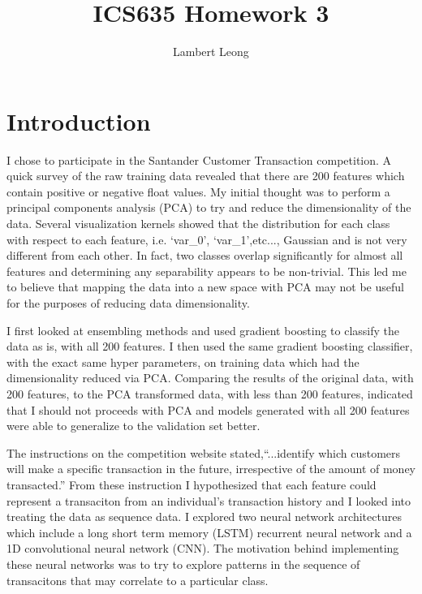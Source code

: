 \documentclass[11pt,letterpaper]{article}
\newcommand{\homework}[2]{
\setcounter{section}{#1}
\section*{ICS635 Homework {\thesection}: {#2} }
{\markboth{#2}{#2}}
}
\begin{document}
\title{ICS635 Homework 3}
\author{Lambert Leong}
\maketitle
\section{Introduction}

I chose to participate in the Santander Customer Transaction competition.  A
quick survey of the raw training data revealed that there are 200 features which
contain positive or negative float values.  My initial thought was to perform a
principal components analysis (PCA) to try and reduce the dimensionality of the
data.  Several visualization kernels showed that the distribution for each
class with respect to each feature, i.e. `var\_0', `var\_1',etc...,  Gaussian
and is not very different from each other.  In fact, two classes overlap
significantly for almost all features and determining any separability appears
to be non-trivial.  This led me to believe that mapping the data into a new
space with PCA may not be useful for the purposes of reducing data
dimensionality.



I first looked at ensembling methods and used gradient boosting to classify the
data as is, with all 200 features.  I then used the same gradient boosting
classifier, with the exact same hyper parameters, on training data which had the
dimensionality reduced via PCA.  Comparing the results of the original data,
with 200 features, to the PCA transformed data, with less than 200 features,
indicated that I should not proceeds with PCA and models generated with all 200
features were able to generalize to the validation set better.

\iftrue
The instructions on the competition website stated,``...identify which customers
will make a specific transaction in the future, irrespective of the amount of
money transacted.'' From these instruction I hypothesized that each feature
could represent a transaciton from an individual's transaction history and I
looked into treating the data as sequence data.  I explored two neural network
architectures which include a long short term memory (LSTM) recurrent neural
network and a 1D convolutional neural network (CNN).  The motivation behind
implementing these neural networks was to try to explore patterns in the
sequence of transacitons that may correlate to a particular class.
\fi
\end{document}
